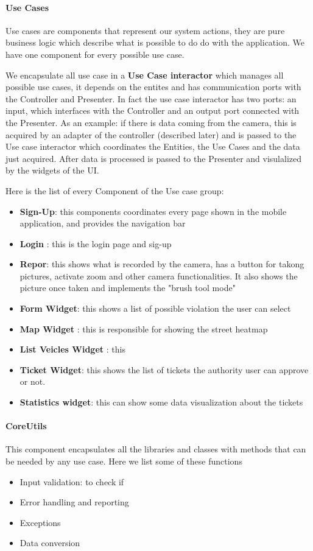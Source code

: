 \paragraph{Use Cases}
Use cases are components that represent our system actions, they are pure business logic which describe what is possible to do do with the application. We have one component for every possible use case.

We encapsulate all use case in a \textbf{Use Case interactor} which manages all possible use cases, it depends on the entites and has communication ports with the Controller and Presenter.
In fact the use case interactor has two ports: an input, which interfaces with the Controller and an output port connected with the Presenter. As an example: if there is data coming from the camera, this is acquired by an adapter of the controller (described later) and is passed to the Use case interactor which coordinates the Entities, the Use Cases and the data just acquired. After data is processed is passed to the Presenter and visulalized by the widgets of the UI.

Here is the list of every Component of the Use case group:
\begin{itemize}
  \item \textbf{Sign-Up}: this components coordinates every page shown in the mobile application, and provides the navigation bar
  \item \textbf{Login } : this is the login page and sig-up
  \item \textbf{Repor}: this shows what is recorded by the camera, has a button for takong pictures, activate zoom and other camera functionalities. It also shows the picture once taken and implements the "brush tool mode"
  \item \textbf{Form Widget}: this shows a list of possible violation the user can select
  \item \textbf{Map Widget} : this is responsible for showing the street heatmap
  \item \textbf{List Veicles Widget} : this
  \item \textbf{Ticket Widget}: this shows the list of tickets the authority user can approve or not.
  \item \textbf{Statistics widget}: this can show some data visualization about the tickets

\end{itemize}


\paragraph{CoreUtils}
This component encapsulates all the libraries and classes with methods that can be needed by any use case.
Here we list some of these functions
\begin{itemize}
  \item Input validation: to check if
  \item Error handling and reporting
  \item Exceptions
  \item Data conversion
\end{itemize}

